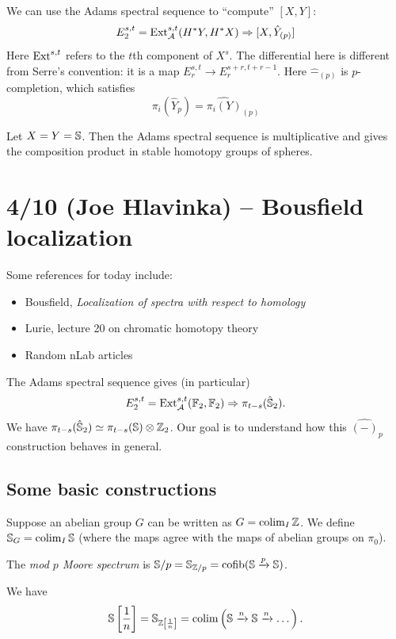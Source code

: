 \documentclass{article}
\begin{document}
We can use the Adams spectral sequence to ``compute'' $[X, Y]$:
\[
	E_2^{s,t} = \operatorname{Ext}_{\mathcal{A}}^{s,t}(H^* Y, H^* X) \Rightarrow [X, \hat{Y}_{(p)}]
\]
Here $\operatorname{Ext}^{s,t}$ refers to the $t$th component of $X^s$.
The differential here is different from Serre's convention: it is a map $E_r^{s,t} \to E_r^{s+r,t+r-1}$.
Here $\hat{-}_{(p)}$ is $p$-completion, which satisfies
\[
	\pi_i(\hat{Y}_p) = \widehat{\pi_i(Y)}_{(p)}
\]

Let $X = Y = \mathbb{S}$.
Then the Adams spectral sequence is multiplicative and gives the composition product in stable homotopy groups of spheres.

\section{4/10 (Joe Hlavinka) -- Bousfield localization}

Some references for today include:
\begin{itemize}
	\item Bousfield, \emph{Localization of spectra with respect to homology}
	\item Lurie, lecture 20 on chromatic homotopy theory
	\item Random nLab articles
\end{itemize}

The Adams spectral sequence gives (in particular)
\[
	E_2^{s,t} = \operatorname{Ext}_{\mathcal{A}}^{s,t}(\mathbb{F}_2, \mathbb{F}_2) \Rightarrow \pi_{t-s}(\hat{\mathbb{S}}_2).
\]
We have $\pi_{t-s}(\hat{\mathbb{S}}_2) \simeq \pi_{t-s}(\mathbb{S}) \otimes \mathbb{Z}_2$.
Our goal is to understand how this $\hat{(-)}_p$ construction behaves in general.

\subsection{Some basic constructions}

Suppose an abelian group $G$ can be written as $G = \operatorname*{colim}_I \mathbb{Z}$.
We define $\mathbb{S}_G = \operatorname*{colim}_I \mathbb{S}$ (where the maps agree with the maps of abelian groups on $\pi_0$).

\begin{ex}
	The \emph{mod $p$ Moore spectrum} is $\mathbb{S} / p = \mathbb{S}_{\mathbb{Z}/p} = \operatorname{cofib}(\mathbb{S} \xrightarrow{p} \mathbb{S})$.
\end{ex}

\begin{ex}
	We have 
	\[
		\mathbb{S}\left[\frac{1}{n}\right] = \mathbb{S}_{\mathbb{Z}\left[\frac{1}{n}\right]} = \operatorname*{colim} \left( \mathbb{S} \xrightarrow{n} \mathbb{S} \xrightarrow{n} \dots \right).
	\]
\end{ex}
\end{document}

